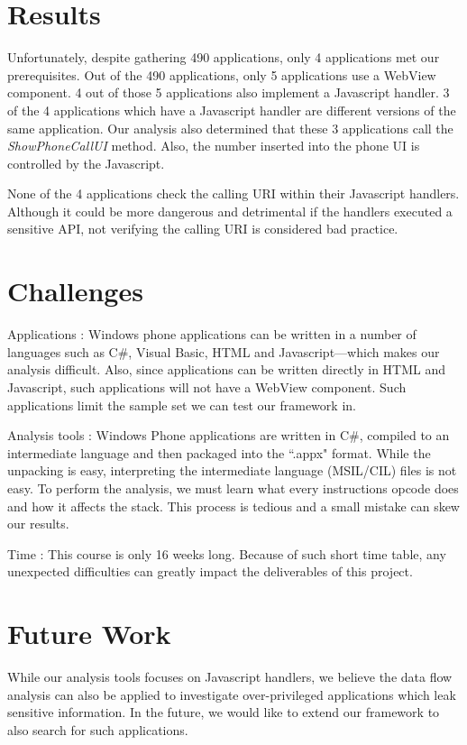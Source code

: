 \documentclass[conference]{IEEEtran}
\begin{document}
\section{Results}

Unfortunately, despite gathering 490 applications, only 4 applications met our prerequisites.
Out of the 490 applications, only 5 applications use a WebView component.
4 out of those 5 applications also implement a Javascript handler.
3 of the 4 applications which have a Javascript handler are different versions of the same application.
Our analysis also determined that these 3 applications call the \textit{ShowPhoneCallUI} method.
Also, the number inserted into the phone UI is controlled by the Javascript.

None of the 4 applications check the calling URI within their Javascript handlers.
Although it could be more dangerous and detrimental if the handlers executed a sensitive API, not verifying the calling URI is considered bad practice.

\section{Challenges}

Applications :  Windows phone applications can be written in a number of languages such as C\#, Visual Basic, HTML and Javascript---which makes our analysis difficult. Also, since applications can be written directly in HTML and Javascript, such applications will not have a WebView component. Such applications limit the sample set we can test our framework in.

Analysis tools : Windows Phone applications are written in C\#, compiled to an intermediate language and then packaged into the ``.appx" format. While the unpacking is easy, interpreting the intermediate language (MSIL/CIL) files is not easy. To perform the analysis, we must learn what every instructions opcode does and how it affects the stack. This process is tedious and a small mistake can skew our results.

Time : This course is only 16 weeks long. Because of such short time table, any unexpected difficulties can greatly impact the deliverables of this project.

\section{Future Work}

While our analysis tools focuses on Javascript handlers, we believe the data flow analysis can also be applied to investigate over-privileged applications which leak sensitive information.
In the future, we would like to extend our framework to also search for such applications.
\end{document}
